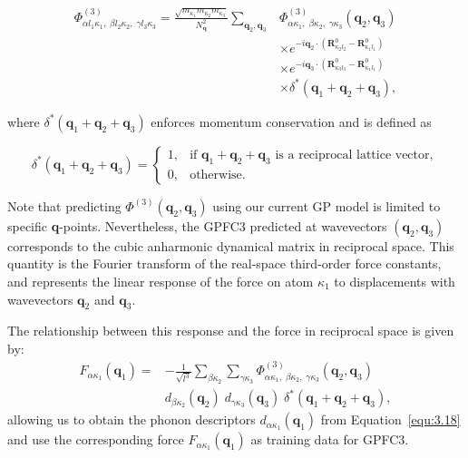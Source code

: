 \begin{equation}
\label{equ:3.21}
\begin{split}
\Phi^{(3)}_{\alpha l_1 \kappa_1,\; \beta l_2 \kappa_2,\; \gamma l_3 \kappa_3}
= \frac{ \sqrt{ m_{\kappa_1} m_{\kappa_2} m_{\kappa_3} } }{ N_{\mathbf{q}}^2 }
\sum_{\mathbf{q}_2, \mathbf{q}_3}
&\Phi^{(3)}_{\alpha \kappa_1,\; \beta \kappa_2,\; \gamma \kappa_3}(\mathbf{q}_2, \mathbf{q}_3) \\
&\times e^{-i \mathbf{q}_2 \cdot \left( \mathbf{R}^{0}_{\kappa_2 l_2} - \mathbf{R}^{0}_{\kappa_1 l_1} \right)} \\
&\times e^{-i \mathbf{q}_3 \cdot \left( \mathbf{R}^{0}_{\kappa_3 l_3} - \mathbf{R}^{0}_{\kappa_1 l_1} \right)} \\
&\times \delta^{*}\left( \mathbf{q}_1 + \mathbf{q}_2 + \mathbf{q}_3 \right),
\end{split}
\end{equation}

where \( \delta^{*}(\mathbf{q}_1 + \mathbf{q}_2 + \mathbf{q}_3) \) enforces momentum conservation and is defined as


\begin{equation}
\label{equ:3.22}
\delta^{*}(\mathbf{q}_1 + \mathbf{q}_2 + \mathbf{q}_3) =
\begin{cases} 
1, & \text{if } \mathbf{q}_1 + \mathbf{q}_2 + \mathbf{q}_3 \text{ is a reciprocal lattice vector}, \\
0, & \text{otherwise}.
\end{cases}
\end{equation}

Note that predicting \( \Phi^{(3)}(\mathbf{q}_2, \mathbf{q}_3) \) using our current GP model is limited to specific \textbf{q}-points. Nevertheless, the GPFC3 predicted at wavevectors \( (\mathbf{q}_2, \mathbf{q}_3) \) corresponds to the cubic anharmonic dynamical matrix in reciprocal space. This quantity is the Fourier transform of the real-space third-order force constants, and represents the linear response of the force on atom \( \kappa_1 \) to displacements with wavevectors \( \mathbf{q}_2 \) and \( \mathbf{q}_3 \).

The relationship between this response and the force in reciprocal space is given by:
\begin{equation}
\label{equ:3.23}
\begin{split}
    F_{\alpha \kappa_1}(\mathbf{q}_1) = &-\frac{1}{\sqrt{l^{3}}} 
\sum_{\beta \kappa_2} \sum_{\gamma \kappa_3}
\Phi^{(3)}_{\alpha \kappa_1,\; \beta \kappa_2,\; \gamma \kappa_3}(\mathbf{q}_2, \mathbf{q}_3)\\
&d_{\beta \kappa_2}(\mathbf{q}_2) \;
d_{\gamma \kappa_3}(\mathbf{q}_3) \;
\delta^{*}(\mathbf{q}_1 + \mathbf{q}_2 + \mathbf{q}_3),
\end{split}
\end{equation}
allowing us to obtain the phonon descriptors \( d_{\alpha \kappa_1}(\mathbf{q}_1) \) from Equation~\eqref{equ:3.18} and use the corresponding force \( F_{\alpha \kappa_1}(\mathbf{q}_1) \) as training data for GPFC3.

